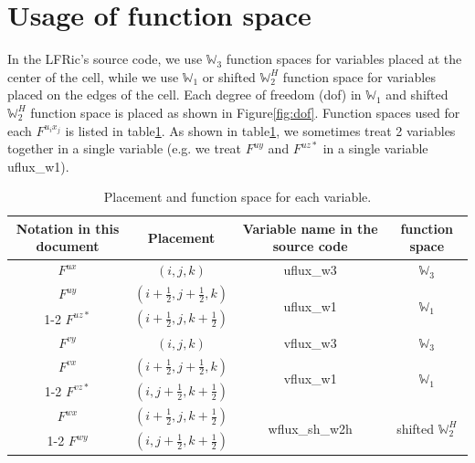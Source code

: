 \documentclass[9pt]{jsarticle}
\begin{document}
\section{Usage of function space}

In the LFRic's source code, we use $\mathbb{W}_3$ function spaces for variables placed at the center of the cell, while we use $\mathbb{W}_1$ or shifted $\mathbb{W}^H_2$ function space for variables placed on the edges of the cell.
Each degree of freedom (dof) in $\mathbb{W}_1$ and shifted $\mathbb{W}_2^H$ function space is placed as shown in Figure\ref{fig:dof}.
Function spaces used for each $F^{u_i x_j}$ is listed in table\ref{tab:def_pos}.
As shown in table\ref{tab:def_pos}, we sometimes treat 2 variables together in a single variable (e.g. we treat $F^{uy}$ and $F^{uz*}$ in a single variable uflux\_w1).


\begin{table}[h]
\centering
\begin{tabular}{|c|c|c|c|}
 \hline
 Notation in this document & Placement        & Variable name in the source code & function space \\
 \hline\hline
 $F^{ux}$ & $(i,j,k)$                         & uflux\_w3                        & $\mathbb{W}_3$                           \\ \hline
 $F^{uy}$ & $(i+\frac{1}{2},j+\frac{1}{2},k)$ & \multirow{2}{*}{uflux\_w1}       & \multirow{2}{*}{$\mathbb{W}_1$}          \\ \cline{1-2}
 $F^{uz*}$& $(i+\frac{1}{2},j,k+\frac{1}{2})$ &                                  &                                \\ \hline
 $F^{vy}$ & $(i,j,k)$                         & vflux\_w3                        & $\mathbb{W}_3$                           \\ \hline
 $F^{vx}$ & $(i+\frac{1}{2},j+\frac{1}{2},k)$ & \multirow{2}{*}{vflux\_w1}       & \multirow{2}{*}{$\mathbb{W}_1$}          \\ \cline{1-2}
 $F^{vz*}$& $(i,j+\frac{1}{2},k+\frac{1}{2})$ &                                  &                                \\ \hline
 $F^{wx}$ & $(i+\frac{1}{2},j,k+\frac{1}{2})$ & \multirow{2}{*}{wflux\_sh\_w2h}  & \multirow{2}{*}{shifted $\mathbb{W}_2^H$} \\ \cline{1-2}
 $F^{wy}$ & $(i,j+\frac{1}{2},k+\frac{1}{2})$ &                                  &                                \\ \hline
\end{tabular}
\caption{Placement and function space for each variable.}
\label{tab:def_pos}
\end{table}
\end{document}
